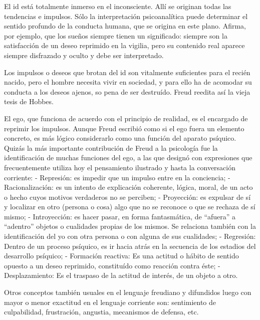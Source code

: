 \documentclass[
]{book}
\begin{document}
El id está totalmente inmerso en el inconsciente. Allí se originan todas las tendencias e impulsos. Sólo la interpretación psicoanalítica puede determinar el sentido profundo de la conducta humana, que se origina en este plano. Afirma, por ejemplo, que los sueños siempre tienen un significado: siempre son la satisfacción de un deseo reprimido en la vigilia, pero su contenido real aparece siempre disfrazado y oculto y debe ser interpretado.

Los impulsos o deseos que brotan del id son vitalmente suficientes para el recién nacido, pero el hombre necesita vivir en sociedad, y para ello ha de acomodar su conducta a los deseos ajenos, so pena de ser destruído. Freud reedita así la vieja tesis de Hobbes.

El ego, que funciona de acuerdo con el principio de realidad, es el encargado de reprimir los impulsos. Aunque Freud escribió como si el ego fuera un elemento concreto, es más lógico considerarlo como una función del aparato psíquico. Quizás la más importante contribución de Freud a la psicología fue la identificación de muchas funciones del ego, a las que designó con expresiones que frecuentemente utiliza hoy el pensamiento ilustrado y hasta la conversación corriente: - Represión: es impedir que un impulso entre en la conciencia; - Racionalización: es un intento de explicación coherente, lógica, moral, de un acto o hecho cuyos motivos verdaderos no se perciben; - Proyección: es expulsar de sí y localizar en otro (persona o cosa) algo que no se reconoce o que se rechaza de sí mismo; - Introyección: es hacer pasar, en forma fantasmática, de ``afuera'' a ``adentro'' objetos o cualidades propias de los mismos. Se relaciona también con la identificación del yo con otra persona o con alguna de sus cualidades; - Regresión: Dentro de un proceso psíquico, es ir hacia atrás en la secuencia de los estadios del desarrollo psíquico; - Formación reactiva: Es una actitud o hábito de sentido opuesto a un deseo reprimido, constituído como reacción contra éste; - Desplazamiento: Es el traspaso de la actitud de interés, de un objeto a otro.

Otros conceptos también usuales en el lenguaje freudiano y difundidos luego con mayor o menor exactitud en el lenguaje corriente son: sentimiento de culpabilidad, frustración, angustia, mecanismos de defensa, etc.
\end{document}
